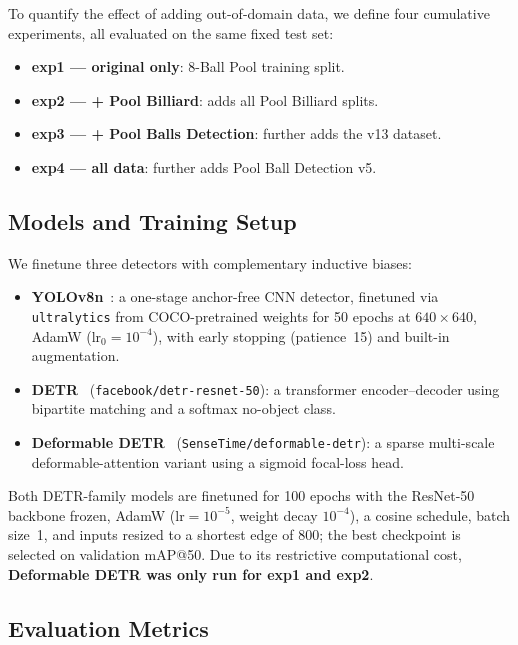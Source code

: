 \documentclass[conference, 10pt]{IEEEtran}
\begin{document}
To quantify the effect of adding out-of-domain data, we define four cumulative experiments, all evaluated on the same fixed test set:

\begin{itemize}
  \item \textbf{exp1 --- original only}: 8-Ball Pool training split.
  \item \textbf{exp2 --- + Pool Billiard}: adds all Pool Billiard splits.
  \item \textbf{exp3 --- + Pool Balls Detection}: further adds the v13 dataset.
  \item \textbf{exp4 --- all data}: further adds Pool Ball Detection v5.
\end{itemize}

\subsection{Models and Training Setup}

We finetune three detectors with complementary inductive biases:

\begin{itemize}
  \item \textbf{YOLOv8n}~\cite{jocher2023yolov8}: a one-stage anchor-free CNN detector, finetuned via \texttt{ultralytics} from COCO-pretrained weights for 50 epochs at $640\times640$, AdamW ($\text{lr}_0=10^{-4}$), with early stopping (patience~15) and built-in augmentation.
  \item \textbf{DETR}~\cite{carion2020detr} (\texttt{facebook/detr-resnet-50}): a transformer encoder--decoder using bipartite matching and a softmax no-object class.
  \item \textbf{Deformable DETR}~\cite{zhu2021deformabledetr} (\texttt{SenseTime/deformable-detr}): a sparse multi-scale deformable-attention variant using a sigmoid focal-loss head.
\end{itemize}

Both DETR-family models are finetuned for 100 epochs with the ResNet-50 backbone frozen, AdamW ($\text{lr}=10^{-5}$, weight decay $10^{-4}$), a cosine schedule, batch size~1, and inputs resized to a shortest edge of 800; the best checkpoint is selected on validation mAP@50.
Due to its restrictive computational cost, \textbf{Deformable DETR was only run for exp1 and exp2}.

\subsection{Evaluation Metrics}
\end{document}

